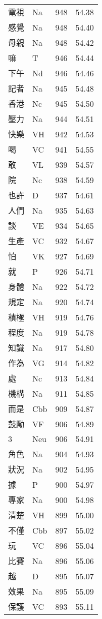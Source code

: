 \documentclass[twocolumn]{book}
\begin{document}
\begin{supertabular}{llrr}
電視 & Na & 948 &  54.38\\
感覺 & Na & 948 &  54.40\\
母親 & Na & 948 &  54.42\\
嘛 & T & 946 &  54.44\\
下午 & Nd & 946 &  54.46\\
記者 & Na & 945 &  54.48\\
香港 & Nc & 945 &  54.50\\
壓力 & Na & 944 &  54.51\\
快樂 & VH & 942 &  54.53\\
喝 & VC & 941 &  54.55\\
敢 & VL & 939 &  54.57\\
院 & Nc & 938 &  54.59\\
也許 & D & 937 &  54.61\\
人們 & Na & 935 &  54.63\\
談 & VE & 934 &  54.65\\
生產 & VC & 932 &  54.67\\
怕 & VK & 927 &  54.69\\
就 & P & 926 &  54.71\\
身體 & Na & 922 &  54.72\\
規定 & Na & 920 &  54.74\\
積極 & VH & 919 &  54.76\\
程度 & Na & 919 &  54.78\\
知識 & Na & 917 &  54.80\\
作為 & VG & 914 &  54.82\\
處 & Nc & 913 &  54.84\\
機構 & Na & 911 &  54.85\\
而是 & Cbb & 909 &  54.87\\
鼓勵 & VF & 906 &  54.89\\
3 & Neu & 906 &  54.91\\
角色 & Na & 904 &  54.93\\
狀況 & Na & 902 &  54.95\\
據 & P & 900 &  54.97\\
專家 & Na & 900 &  54.98\\
清楚 & VH & 899 &  55.00\\
不僅 & Cbb & 897 &  55.02\\
玩 & VC & 896 &  55.04\\
比賽 & Na & 896 &  55.06\\
越 & D & 895 &  55.07\\
效果 & Na & 895 &  55.09\\
保護 & VC & 893 &  55.11\\

\end{supertabular}
\end{document}
